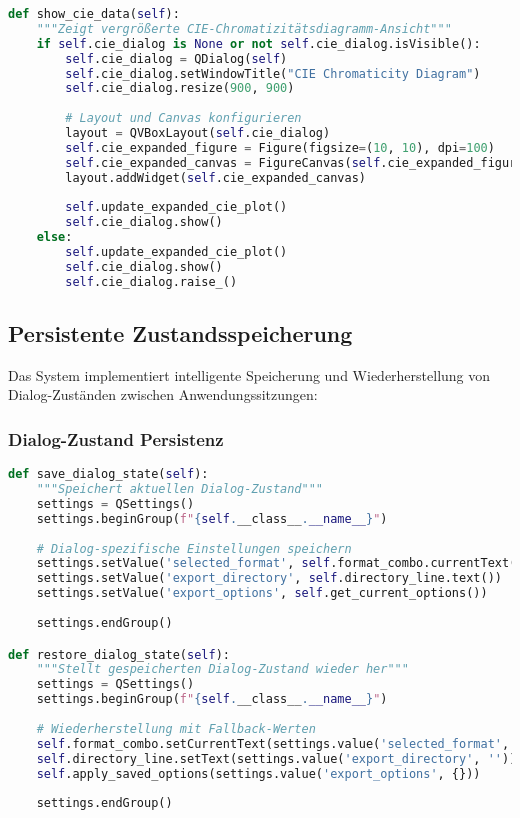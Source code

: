\begin{lstlisting}[language=Python, caption=CIE-Dialog für erweiterte Visualisierung]
def show_cie_data(self):
    """Zeigt vergrößerte CIE-Chromatizitätsdiagramm-Ansicht"""
    if self.cie_dialog is None or not self.cie_dialog.isVisible():
        self.cie_dialog = QDialog(self)
        self.cie_dialog.setWindowTitle("CIE Chromaticity Diagram")
        self.cie_dialog.resize(900, 900)
        
        # Layout und Canvas konfigurieren
        layout = QVBoxLayout(self.cie_dialog)
        self.cie_expanded_figure = Figure(figsize=(10, 10), dpi=100)
        self.cie_expanded_canvas = FigureCanvas(self.cie_expanded_figure)
        layout.addWidget(self.cie_expanded_canvas)
        
        self.update_expanded_cie_plot()
        self.cie_dialog.show()
    else:
        self.update_expanded_cie_plot()
        self.cie_dialog.show()
        self.cie_dialog.raise_()
\end{lstlisting}

\subsection{Persistente Zustandsspeicherung}

Das System implementiert intelligente Speicherung und Wiederherstellung von Dialog-Zuständen zwischen Anwendungssitzungen:

\subsubsection{Dialog-Zustand Persistenz}

\begin{lstlisting}[language=Python, caption=Dialog-Zustand Management]
def save_dialog_state(self):
    """Speichert aktuellen Dialog-Zustand"""
    settings = QSettings()
    settings.beginGroup(f"{self.__class__.__name__}")
    
    # Dialog-spezifische Einstellungen speichern
    settings.setValue('selected_format', self.format_combo.currentText())
    settings.setValue('export_directory', self.directory_line.text())
    settings.setValue('export_options', self.get_current_options())
    
    settings.endGroup()

def restore_dialog_state(self):
    """Stellt gespeicherten Dialog-Zustand wieder her"""
    settings = QSettings()
    settings.beginGroup(f"{self.__class__.__name__}")
    
    # Wiederherstellung mit Fallback-Werten
    self.format_combo.setCurrentText(settings.value('selected_format', 'CSV'))
    self.directory_line.setText(settings.value('export_directory', ''))
    self.apply_saved_options(settings.value('export_options', {}))
    
    settings.endGroup()
\end{lstlisting}

